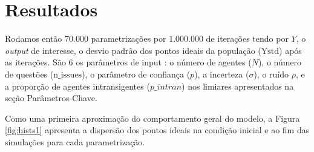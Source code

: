 \section{Resultados}

Rodamos então \(70.000\) parametrizações por \(1.000.000\) de iterações tendo
por \(Y\), o \textit{output} de interesse, o desvio padrão  dos pontos ideais da
população (\(\text{Ystd}\)) após as iterações. São \(6\) os parâmetros de input
: o número de agentes (\(N\)), o número de questões (\(\text{n\_issues}\)), o
parâmetro de confiança (\(p\)), a incerteza (\(\sigma\)),  o ruído \(\rho\), e a
proporção de agentes intransigentes (\(p\_intran\)) nos
limiares apresentados na seção Parâmetros-Chave.

Como uma primeira aproximação do comportamento geral do modelo, a Figura
\ref{fig:hists1} apresenta a dispersão dos pontos ideais na condição inicial e
ao fim das simulações para cada parametrização.

